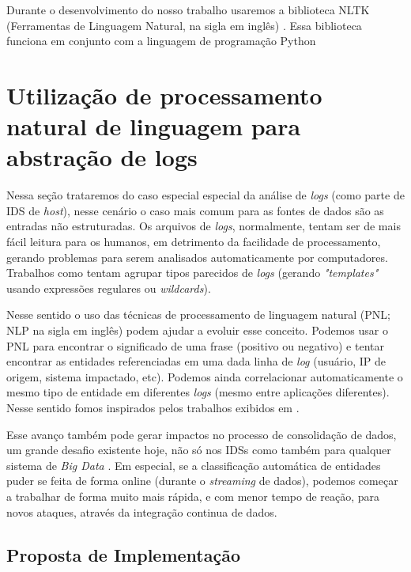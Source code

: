 \documentclass[
	12pt,				%
	openright,			%
	twoside,			%
	a4paper,			%
	english,			%
	french,				%
	spanish,			%
	brazil,				%
	]{abntex2}
\begin{document}
Durante o desenvolvimento do nosso trabalho usaremos a biblioteca NLTK (Ferramentas de Linguagem Natural, na sigla em inglês) \cite{bird2009natural}. Essa biblioteca funciona em conjunto com a linguagem de programação Python


\chapter{Utilização de processamento natural de linguagem para abstração de logs}\label{chap:proposta}

Nessa seção trataremos do caso especial especial da análise de \emph{logs} (como parte de IDS de \emph{host}), nesse cenário o caso mais comum para as fontes de dados são as entradas não estruturadas. Os arquivos de \emph{logs}, normalmente, tentam ser de mais fácil leitura para os humanos, em detrimento da facilidade de processamento, gerando problemas para serem analisados automaticamente por computadores. Trabalhos como \cite{vaarandi2003data, nagappan2010abstracting} tentam agrupar tipos parecidos de \emph{logs} (gerando \emph{"templates"} usando expressões regulares ou \emph{wildcards}).

Nesse sentido o uso das técnicas de processamento de linguagem natural (PNL; NLP na sigla em inglês) podem ajudar a evoluir esse conceito. Podemos usar o PNL para encontrar o significado de uma frase (positivo ou negativo) e tentar encontrar as entidades referenciadas em uma dada linha de \emph{log} (usuário, IP de origem, sistema impactado, etc). Podemos ainda correlacionar automaticamente o mesmo tipo de entidade em diferentes \emph{logs} (mesmo entre aplicações diferentes).  Nesse sentido fomos inspirados pelos trabalhos exibidos em \cite{matos2010environment, duque2012processo}.

Esse avanço também pode gerar impactos no processo de consolidação de dados, um grande desafio existente hoje, não só nos IDSs como também para qualquer sistema de \emph{Big Data} \cite{zuech2015intrusion}. Em especial, se a classificação automática de entidades puder se feita de forma online (durante o  \emph{streaming} de dados), podemos começar a trabalhar de forma muito mais rápida, e com menor tempo de reação, para novos ataques, através da integração continua de dados.

\section{Proposta de Implementação}\label{sec:implementacao}
\end{document}
